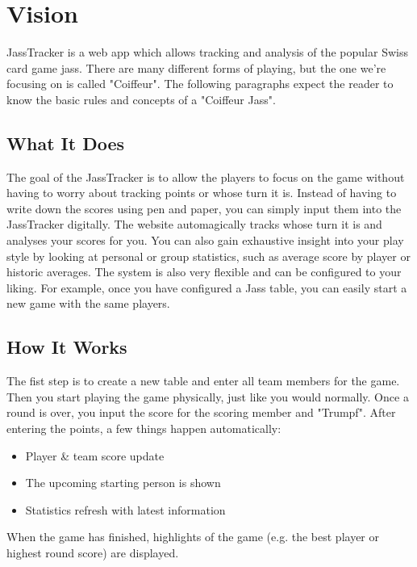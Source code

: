 \chapter{Vision}

JassTracker is a web app which allows tracking and analysis of the popular Swiss card game \gls{jass}.
There are many different forms of playing, but the one we're focusing on is called "Coiffeur".
The following paragraphs expect the reader to know the basic rules and concepts of a "Coiffeur Jass".

\section*{What It Does}
The goal of the JassTracker is to allow the players to focus on the game without having to worry about tracking points or whose turn it is.
Instead of having to write down the scores using pen and paper, you can simply input them into the JassTracker digitally.
The website automagically tracks whose turn it is and analyses your scores for you.
You can also gain exhaustive insight into your play style by looking at personal or group statistics, such as average score by player or historic averages.
The system is also very flexible and can be configured to your liking.
For example, once you have configured a Jass table, you can easily start a new game with the same players.

\section*{How It Works}
The fist step is to create a new table and enter all team members for the game.
Then you start playing the game physically, just like you would normally.
Once a round is over, you input the score for the scoring member and "Trumpf".
After entering the points, a few things happen automatically:
\begin{itemize}
    \item Player \& team score update
    \item The upcoming starting person is shown
    \item Statistics refresh with latest information
\end{itemize}
When the game has finished, highlights of the game (e.g. the best player or highest round score) are displayed.

